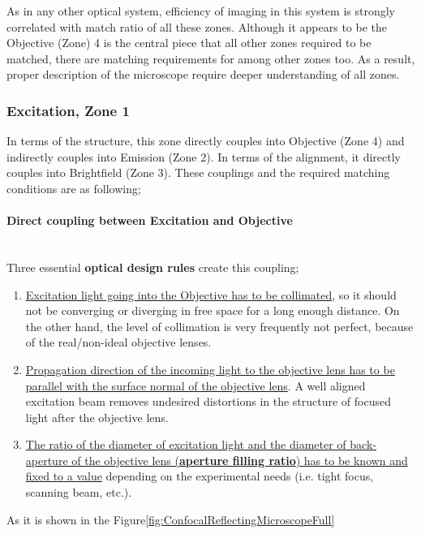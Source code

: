 As in any other optical system, efficiency of imaging in this system is strongly correlated with
match ratio of all these zones. Although it appears to be the Objective (Zone) 4 is the central
piece that all other zones required to be matched, there are matching requirements for among other
zones too. As a result, proper description of the microscope require deeper understanding of all
zones.

\subsubsection{Excitation, Zone 1}
In terms of the structure, this zone directly couples into Objective (Zone 4) and indirectly couples 
into Emission (Zone 2). In terms of the alignment, it directly couples into Brightfield (Zone 3).
These couplings and the required matching conditions are as following;

\paragraph{Direct coupling between Excitation and Objective}\mbox{}\\
Three essential \textbf{optical design rules} create this coupling;

\begin{enumerate}
	\item \ul{Excitation light going into the Objective has to be collimated}, so it should not be
	converging or diverging in free space for a long enough distance. On the other hand, the level of 
	collimation is very frequently not perfect, because of the real/non-ideal objective lenses.
	
	\item \ul{Propagation direction of the incoming light to the objective lens has to be 
	parallel with the surface normal of the objective lens}. A well aligned excitation beam 
	removes undesired distortions in the structure of focused light after the objective lens.
	
	\item \ul{The ratio of the diameter of excitation light and the diameter of back-aperture of the 
	objective lens (\textbf{aperture filling ratio}) has to be known and fixed to a value} 
	depending on the experimental needs (i.e. tight focus, scanning beam, etc.).
\end{enumerate}

As it is shown in the Figure\ref{fig:ConfocalReflectingMicroscopeFull}